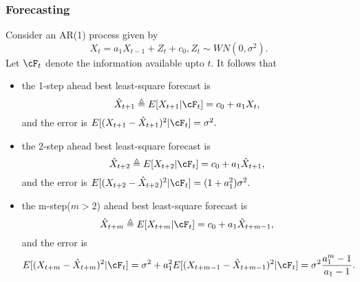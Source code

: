 \subsubsection{Forecasting}
\begin{lemma}\cite[55]{tsay2005analysis}
	Consider an AR(1) process given by $$X_t = a_1 X_{t-1} + Z_t + c_0, Z_t\sim WN(0,\sigma^2).$$ Let $\cF_t$ denote the information available upto $t$. It follows that
	\begin{itemize}
		\item the 1-step ahead best least-square forecast is
		$$\hat{X}_{t+1} \triangleq E[X_{t+1}|\cF_t]= c_0 + a_1X_t,$$
		and the error is $E[(X_{t+1} - \hat{X}_{t+1})^2|\cF_t] = \sigma^2.$	
		\item the 2-step ahead best least-square forecast is
		$$\hat{X}_{t+2}\triangleq E[X_{t+2}|\cF_t] = c_0 + a_1\hat{X}_{t+1},$$
		and the error is $E[(X_{t+2} - \hat{X}_{t+2})^2|\cF_t] = (1 + a_1^2)\sigma^2.$	
		
		\item the m-step($m > 2$) ahead best least-square forecast is
		$$\hat{X}_{t+m}\triangleq E[X_{t+m}|\cF_t] = c_0 + a_1 \hat{X}_{t+m-1},$$
		and the error is $$E[(X_{t+m} - \hat{X}_{t+m})^2|\cF_t] = \sigma^2 + a_1^2E[(X_{t+m-1} - \hat{X}_{t+m-1})^2|\cF_t] = \sigma^2 \frac{a_1^m - 1}{a_1 - 1} .$$
	\end{itemize}
\end{lemma}
